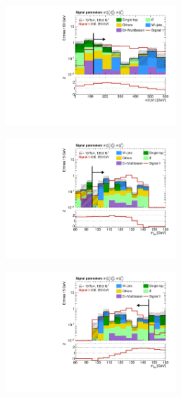 \begin{figure}
\begin{subfigure}[b]{0.5\linewidth}
		\caption{}
	\end{subfigure}\hfill
	\begin{subfigure}[b]{0.5\linewidth}
		\centering\includegraphics[width=0.7\textwidth]{N-1_cut_scan/n1_800_250/mlb1}
		\caption{}
	\end{subfigure}\hfill
	\begin{subfigure}[b]{0.5\linewidth}
		\centering\includegraphics[width=0.7\textwidth]{N-1_cut_scan/n1_800_250/mbb_lower}
		\caption{}
	\end{subfigure}\hfill
	\begin{subfigure}[b]{0.5\linewidth}
		\centering\includegraphics[width=0.7\textwidth]{N-1_cut_scan/n1_800_250/mbb_upper}

\end{subfigure}
\end{figure}
